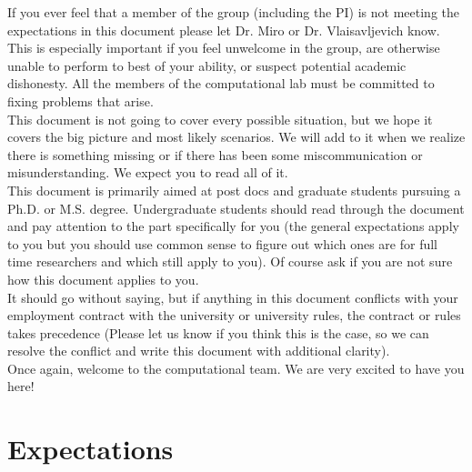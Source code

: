 \documentclass[letterpaper]{article}
\begin{document}
If you ever feel that a member of the group (including the PI) is not meeting the expectations in this document please let Dr. Miro or Dr. Vlaisavljevich know. This is especially important if you feel unwelcome in the group, are otherwise unable to perform to best of your ability, or suspect potential academic dishonesty. All the members of the computational lab must be committed to fixing problems that arise.\\

This document is not going to cover every possible situation, but we hope it covers the big picture and most likely scenarios. We will add to it when we realize there is something missing or if there has been some miscommunication or misunderstanding. We expect you to read all of it.\\

This document is primarily aimed at post docs and graduate students pursuing a Ph.D. or M.S. degree. Undergraduate students should read through the document and pay attention to the part specifically for you (the general expectations apply to you but you should use common sense to figure out which ones are for full time researchers and which still apply to you). Of course ask if you are not sure how this document applies to you.\\

It should go without saying, but if anything in this document conflicts with your employment contract with the university or university rules, the contract or rules takes precedence (Please let us know if you think this is the case, so we can resolve the conflict and write this document with additional clarity).\\

Once again, welcome to the computational team. We are very excited to have you here!

\section{Expectations}
\end{document}
